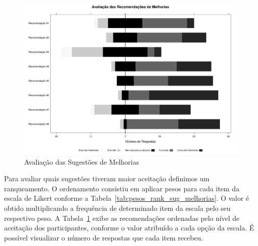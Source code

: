 \begin{figure}[htpb]
    \centering
    \includegraphics[width=.9\linewidth]{chapter-sugestoes-melhorias-fgrm/img/plot_likert_avaliacao_sug_melhorias_grayscale.pdf}
    \caption{Avaliação das Sugestões de Melhorias}\label{fig:plot_likert_avaliacao_sug_melhorias}
\end{figure}

Para avaliar quais sugestões tiveram maior aceitação definimos um ranqueamento.
O ordenamento consistiu em aplicar pesos para cada item da escala de Likert
conforme a Tabela~\ref{tab:pesos_rank_sug_melhorias}. O valor é obtido
multiplicando a frequência de determinado item da escala pelo seu respectivo
peso. A Tabela~\ref{fig:plot_likert_avaliacao_sug_melhorias} exibe as
recomendações ordenadas pelo nível de aceitação dos participantes, conforme o
valor atribuído a cada opção da escala. É possível visualizar o número de
respostas que cada item recebeu.

\begin{table}[htpb]
\centering
{}
\caption{Pesos utilizados para ordenar as sugestões propostas.}
\label{tab:pesos_rank_sug_melhorias}
\end{table}

